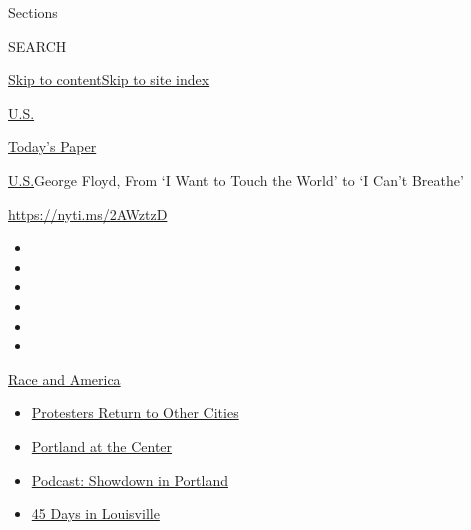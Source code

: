 Sections

SEARCH

\protect\hyperlink{site-content}{Skip to
content}\protect\hyperlink{site-index}{Skip to site index}

\href{https://www.nytimes.com/section/us}{U.S.}

\href{https://myaccount.nytimes.com/auth/login?response_type=cookie\&client_id=vi}{}

\href{https://www.nytimes.com/section/todayspaper}{Today's Paper}

\href{/section/us}{U.S.}\textbar{}George Floyd, From `I Want to Touch
the World' to `I Can't Breathe'

\url{https://nyti.ms/2AWztzD}

\begin{itemize}
\item
\item
\item
\item
\item
\item
\end{itemize}

\href{https://www.nytimes.com/news-event/george-floyd-protests-minneapolis-new-york-los-angeles?action=click\&pgtype=Article\&state=default\&region=TOP_BANNER\&context=storylines_menu}{Race
and America}

\begin{itemize}
\tightlist
\item
  \href{https://www.nytimes.com/2020/07/26/us/protests-portland-seattle-trump.html?action=click\&pgtype=Article\&state=default\&region=TOP_BANNER\&context=storylines_menu}{Protesters
  Return to Other Cities}
\item
  \href{https://www.nytimes.com/2020/07/24/us/portland-oregon-protests-white-race.html?action=click\&pgtype=Article\&state=default\&region=TOP_BANNER\&context=storylines_menu}{Portland
  at the Center}
\item
  \href{https://www.nytimes.com/2020/07/23/podcasts/the-daily/portland-protests.html?action=click\&pgtype=Article\&state=default\&region=TOP_BANNER\&context=storylines_menu}{Podcast:
  Showdown in Portland}
\item
  \href{https://www.nytimes.com/interactive/2020/07/16/us/black-lives-matter-protests-louisville-breonna-taylor.html?action=click\&pgtype=Article\&state=default\&region=TOP_BANNER\&context=storylines_menu}{45
  Days in Louisville}
\end{itemize}

